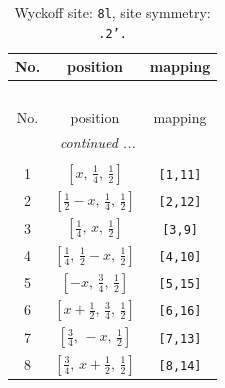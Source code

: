 \documentclass[fleqn,8pt]{jsarticle}
\begin{document}
\begin{longtable}{ccc}
\caption{Wyckoff site: {\tt 8l}, site symmetry: {\tt .2'.}}
 \\
 \hline \hline
No. & position & mapping \\ \hline \endfirsthead

\multicolumn{2}{l}{\tablename\ \thetable{}} \\
 \hline \hline
No. & position & mapping \\ \hline \endhead

 \hline \hline
\multicolumn{2}{r}{\footnotesize\it continued ...} \\ \endfoot

 \hline \hline
\multicolumn{2}{r}{} \\ \endlastfoot

1 & $\left[ x,\, \frac{1}{4},\, \frac{1}{2} \right]$ & {\tt [1,11]} \\ \hline
2 & $\left[ \frac{1}{2} - x,\, \frac{1}{4},\, \frac{1}{2} \right]$ & {\tt [2,12]} \\ \hline
3 & $\left[ \frac{1}{4},\, x,\, \frac{1}{2} \right]$ & {\tt [3,9]} \\ \hline
4 & $\left[ \frac{1}{4},\, \frac{1}{2} - x,\, \frac{1}{2} \right]$ & {\tt [4,10]} \\ \hline
5 & $\left[ - x,\, \frac{3}{4},\, \frac{1}{2} \right]$ & {\tt [5,15]} \\ \hline
6 & $\left[ x + \frac{1}{2},\, \frac{3}{4},\, \frac{1}{2} \right]$ & {\tt [6,16]} \\ \hline
7 & $\left[ \frac{3}{4},\, - x,\, \frac{1}{2} \right]$ & {\tt [7,13]} \\ \hline
8 & $\left[ \frac{3}{4},\, x + \frac{1}{2},\, \frac{1}{2} \right]$ & {\tt [8,14]} \\
\end{longtable}
\renewcommand{\arraystretch}{1.2}
\end{document}
